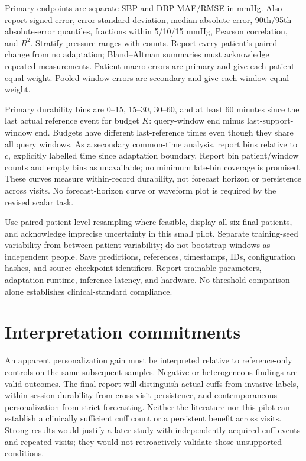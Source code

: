 \documentclass[11pt]{article}
\begin{document}
Primary endpoints are separate SBP and DBP MAE/RMSE in mmHg. Also report signed error, error standard deviation, median absolute error, 90th/95th absolute-error quantiles, fractions within 5/10/15 mmHg, Pearson correlation, and $R^2$. Stratify pressure ranges with counts. Report every patient's paired change from no adaptation; Bland--Altman summaries must acknowledge repeated measurements. Patient-macro errors are primary and give each patient equal weight. Pooled-window errors are secondary and give each window equal weight.

Primary durability bins are 0--15, 15--30, 30--60, and at least 60 minutes since the last actual reference event for budget $K$: query-window end minus last-support-window end. Budgets have different last-reference times even though they share all query windows. As a secondary common-time analysis, report bins relative to $c$, explicitly labelled time since adaptation boundary. Report bin patient/window counts and empty bins as unavailable; no minimum late-bin coverage is promised. These curves measure within-record durability, not forecast horizon or persistence across visits. No forecast-horizon curve or waveform plot is required by the revised scalar task.

Use paired patient-level resampling where feasible, display all six final patients, and acknowledge imprecise uncertainty in this small pilot. Separate training-seed variability from between-patient variability; do not bootstrap windows as independent people. Save predictions, references, timestamps, IDs, configuration hashes, and source checkpoint identifiers. Report trainable parameters, adaptation runtime, inference latency, and hardware. No threshold comparison alone establishes clinical-standard compliance.

\section{Interpretation commitments}
An apparent personalization gain must be interpreted relative to reference-only controls on the same subsequent samples. Negative or heterogeneous findings are valid outcomes. The final report will distinguish actual cuffs from invasive labels, within-session durability from cross-visit persistence, and contemporaneous personalization from strict forecasting. Neither the literature nor this pilot can establish a clinically sufficient cuff count or a persistent benefit across visits. Strong results would justify a later study with independently acquired cuff events and repeated visits; they would not retroactively validate those unsupported conditions.


\end{document}
